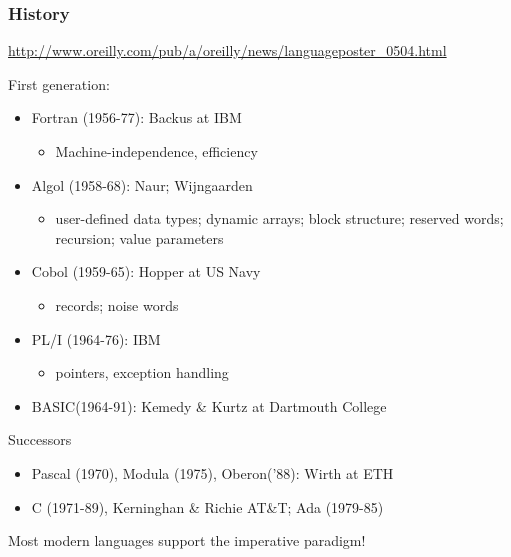 \documentclass{beamer}
\begin{document}
\begin{frame}[fragile]
\frametitle{History}
\url{http://www.oreilly.com/pub/a/oreilly/news/languageposter_0504.html}

First generation:
\begin{itemize}
\item Fortran (1956-77): Backus at IBM
\begin{itemize}
\item Machine-independence, efficiency 
\end{itemize}


\item Algol (1958-68): Naur; Wijngaarden
\begin{itemize}
\item user-defined data types; dynamic arrays; block structure;
reserved words; recursion; value parameters
\end{itemize}
\item Cobol (1959-65):  Hopper at US Navy
\begin{itemize}
\item records; noise words
\end{itemize}


\item PL/I (1964-76):  IBM
\begin{itemize}
\item pointers, exception handling 
\end{itemize} 
\item BASIC(1964-91): Kemedy \& Kurtz at Dartmouth College
\end{itemize}
Successors
\begin{itemize}
\item Pascal (1970), Modula (1975), Oberon('88): Wirth at ETH 
\item C (1971-89), Kerninghan \& Richie AT\&T;  Ada (1979-85)
\end{itemize}
Most modern languages support the imperative paradigm!
\end{frame}
\end{document}
